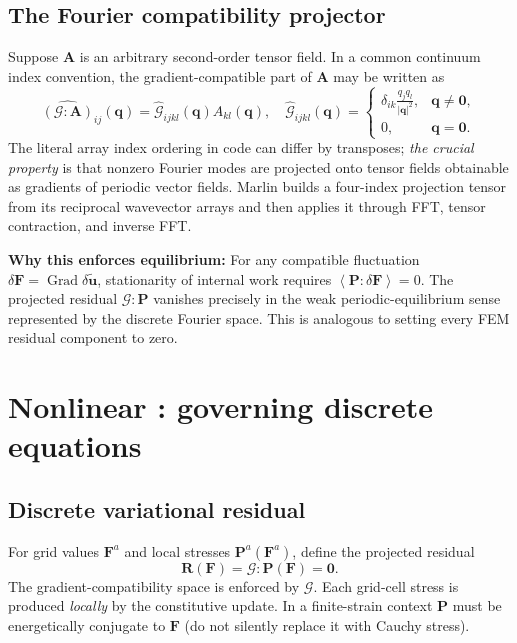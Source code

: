 \documentclass[11pt,a4paper]{article}
\newcommand{\avg}[1]{\left\langle #1\right\rangle}
\newcommand{\Grad}{\operatorname{Grad}}
\newcommand{\code}[1]{\texttt{\detokenize{#1}}}
\begin{document}
\subsection{The Fourier compatibility projector}
Suppose $\mathbf A$ is an arbitrary second-order tensor field. In a common continuum index convention, the gradient-compatible part of $\mathbf A$ may be written as
\begin{equation}
\widehat{(\mathcal G:\mathbf A)}_{ij}(\mathbf q)=
\widehat{\mathcal G}_{ijkl}(\mathbf q)\widehat A_{kl}(\mathbf q),\quad
\widehat{\mathcal G}_{ijkl}(\mathbf q)=
\begin{cases}
\displaystyle\delta_{ik}\frac{q_j q_l}{|\mathbf q|^2},&\mathbf q\ne\mathbf0,\\
0,&\mathbf q=\mathbf0.
\end{cases}
\label{eq:proj}
\end{equation}
The literal array index ordering in code can differ by transposes; \emph{the crucial property} is that nonzero Fourier modes are projected onto tensor fields obtainable as gradients of periodic vector fields. Marlin builds a four-index projection tensor from its reciprocal wavevector arrays and then applies it through FFT, tensor contraction, and inverse FFT.

\begin{keybox}
\textbf{Why this enforces equilibrium:} For any compatible fluctuation $\delta\mathbf F=\Grad\delta\widetilde{\mathbf u}$, stationarity of internal work requires $\avg{\mathbf P:\delta\mathbf F}=0$. The projected residual $\mathcal G:\mathbf P$ vanishes precisely in the weak periodic-equilibrium sense represented by the discrete Fourier space. This is analogous to setting every FEM residual component to zero.
\end{keybox}

\section{Nonlinear \code{FFTMechanics}: governing discrete equations}
\label{sec:newton}
\subsection{Discrete variational residual}
For grid values $\mathbf F^a$ and local stresses $\mathbf P^a(\mathbf F^a)$, define the projected residual
\begin{equation}
\mathbf R(\mathbf F)=\mathcal G:\mathbf P(\mathbf F)=\mathbf0.
\label{eq:res}
\end{equation}
The gradient-compatibility space is enforced by $\mathcal G$. Each grid-cell stress is produced \emph{locally} by the constitutive update. In a finite-strain context $\mathbf P$ must be energetically conjugate to $\mathbf F$ (do not silently replace it with Cauchy stress).
\end{document}
